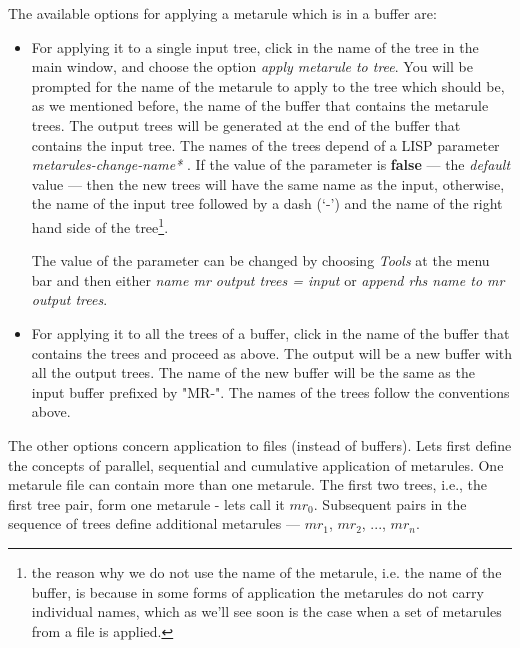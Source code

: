 The available options for applying a metarule which is in a buffer are:

\begin{itemize}
\item   For applying it to a single input tree, click in the name of the
        tree in the main window, and choose the option 
        {\it apply metarule to tree}. 
        You will be prompted for the name of the metarule
        to apply to the tree
        which should be, as we mentioned before, the name of the buffer that
        contains the metarule trees. The output trees will be generated
        at the end of the buffer that contains the input tree. The names of
        the trees depend of a LISP parameter {\it *metarules-change-name* }.
        If the value of the parameter is {\bf false} --- the {\it default} 
        value --- then the new trees will have the same name as the input, 
        otherwise, the name of the input tree followed by a dash (`-') and
        the name of the right hand side of the tree\footnote{the reason why 
        we do not use the name of the metarule, i.e. the name of the buffer,
        is because in some forms of application the metarules do not
        carry individual names, which as we'll see soon is the case when 
	a set of
        metarules from a file is applied.}.

        The value of the parameter can be changed by choosing {\it Tools} 
        at the menu bar and then either {\it name mr output trees =
        input}  or {\it append rhs name to mr output trees}.

        
\item   For applying it to all the trees of a buffer, click in the name of the 
        buffer that contains the trees and proceed as above. The output will
        be a new buffer with all the output trees. The name of the new buffer
        will be the same as the input buffer prefixed by "MR-". The names of
        the trees follow the conventions above.

\end{itemize}

The other options concern application to files (instead of buffers). 
Lets first define
the concepts of parallel, sequential and cumulative application of metarules. 
One metarule 
file can contain more than one metarule. The first two trees, i.e., the first
tree pair, form one metarule - lets call it $mr_0$. Subsequent pairs in the
sequence of trees define additional metarules --- 
$mr_1$, $mr_2$, ..., $mr_n$.

